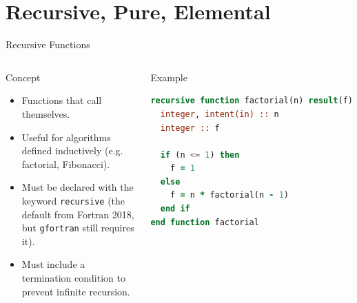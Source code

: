 \section{Recursive, Pure, Elemental}

\begin{frame}[fragile]{Recursive Functions}
  \begin{columns}[T]
    \begin{block}{Concept}
      \begin{itemize}
        \item Functions that call themselves.
        \item Useful for algorithms defined inductively
              (e.g. factorial, Fibonacci).
        \item Must be declared with the keyword
              \texttt{recursive} (the default from Fortran 2018,
              but \texttt{gfortran} still requires it).
        \item Must include a termination condition to
              prevent infinite recursion.
      \end{itemize}
    \end{block}

    \begin{block}{Example}
\begin{lstlisting}[language=Fortran]
recursive function factorial(n) result(f)
  integer, intent(in) :: n
  integer :: f

  if (n <= 1) then
    f = 1
  else
    f = n * factorial(n - 1)
  end if
end function factorial
\end{lstlisting}
    \end{block}
  \end{columns}
\end{frame}

